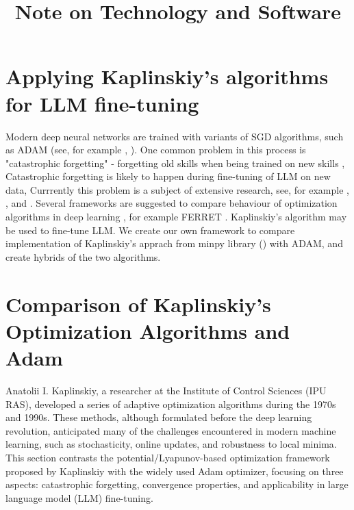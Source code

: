 \documentclass[12pt]{article}
\title{Note on Technology and Software}
\author{}
\date{}
\begin{document}
\maketitle

\section{Applying Kaplinskiy's algorithms for LLM fine-tuning}

Modern deep neural networks are trained with variants of SGD algorithms, such as  ADAM (see, for example \cite{ZMBVK}, \cite{GSM}). One common problem in this process is "catastrophic forgetting" - forgetting old skills when being trained on new skills \cite{VSK}, Catastrophic forgetting is likely to happen during fine-tuning of  LLM  on new data,  Currrently this problem is a subject of extensive research, see, for example , \cite{LMLZ} , \cite{LDFT} and \cite{KSR}.  Several frameworks are suggested to compare behaviour of optimization algorithms in deep learning , for example FERRET \cite{AND}.  Kaplinskiy's algorithm \cite{KAP2} may be used to fine-tune LLM. We create our own  framework to compare implementation of Kaplinskiy's apprach from minpy library (\cite{MP}) with ADAM, and  create hybrids of the two algorithms.



\section{Comparison of Kaplinskiy’s Optimization Algorithms and Adam}

Anatolii I. Kaplinskiy, a researcher at the Institute of Control Sciences (IPU RAS), developed a series of adaptive optimization algorithms during the 1970s and 1990s. These methods, although formulated before the deep learning revolution, anticipated many of the challenges encountered in modern machine learning, such as stochasticity, online updates, and robustness to local minima.
This section contrasts the potential/Lyapunov-based optimization framework proposed by Kaplinskiy with the widely used Adam optimizer, focusing on three aspects: catastrophic forgetting, convergence properties, and applicability in large language model (LLM) fine-tuning.
\end{document}
